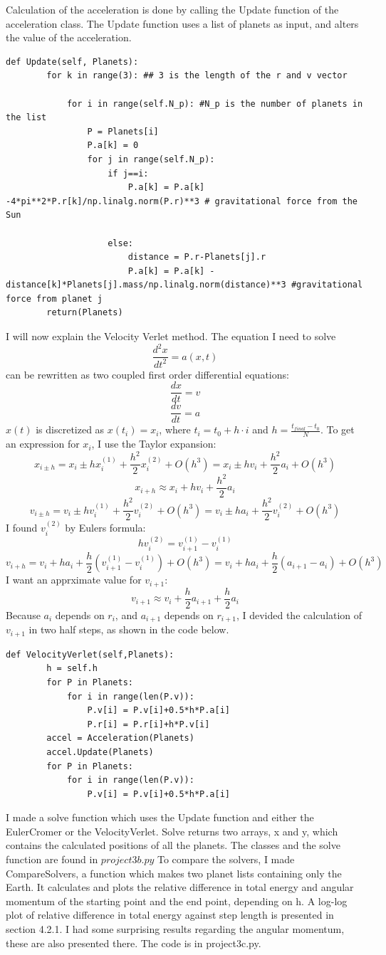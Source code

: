 \documentclass{article}
\begin{document}
Calculation of the acceleration is done by calling the Update function of the acceleration class. The Update function uses a list of planets as input, and alters the value of the acceleration. 
\begin{verbatim}
def Update(self, Planets):
		for k in range(3): ## 3 is the length of the r and v vector

			for i in range(self.N_p): #N_p is the number of planets in the list
				P = Planets[i]
				P.a[k] = 0
				for j in range(self.N_p):
					if j==i:
						P.a[k] = P.a[k] -4*pi**2*P.r[k]/np.linalg.norm(P.r)**3 # gravitational force from the Sun
						
					else: 
						distance = P.r-Planets[j].r
						P.a[k] = P.a[k] - distance[k]*Planets[j].mass/np.linalg.norm(distance)**3 #gravitational force from planet j
		return(Planets)

\end{verbatim}


I will now explain the Velocity Verlet method. 
The equation I need to solve $$\frac{d^2x}{dt^2}=a(x,t)$$ can be rewritten as two coupled first order differential equations:
$$\frac{dx}{dt} = v$$
$$\frac{dv}{dt} = a$$
$x(t)$ is discretized as $x(t_i)=x_i$, where $t_i =t_0 +h\cdot i$ and $h=\frac{t_{final}-t_0}{N}$. To get an expression for $x_i$, I use the Taylor expansion:
$$x_{i \pm h}  = x_i \pm hx_i^{(1)}+\frac{h^2}{2} x_i^{(2)}+O(h^3)=x_i \pm hv_i + \frac{h^2}{2}a_i +O(h^3)$$
$$x_{i + h}  \approx x_i + hv_i + \frac{h^2}{2}a_i$$
$$v_{i \pm h}  = v_i \pm hv_i^{(1)}+\frac{h^2}{2} v_i^{(2)}+O(h^3) = v_i \pm ha_i + \frac{h^2}{2} v_i^{(2)}+O(h^3)$$
I found $v_i^{(2)}$  by Eulers formula: 
$$hv_i^{(2)}=v_{i+1}^{(1)}-v_i^{(1)}$$
$$v_{i + h} = v_i + ha_i + \frac{h}{2} (v_{i+1}^{(1)}-v_i^{(1)})+O(h^3)= v_i + ha_i + \frac{h}{2}(a_{i+1}-a_{i})+O(h^3)$$
I want an apprximate value for $v_{i+1}$:
$$v_{i+1} \approx v_i + \frac{h}{2}a_{i+1}+\frac{h}{2} a_{i}$$
Because $a_i$ depends on $r_i$, and $a_{i+1}$ depends on $r_{i+1}$, I devided the calculation of $v_{i+1}$ in two half steps, as shown in the code below. 
\begin{verbatim}
def VelocityVerlet(self,Planets):
		h = self.h
		for P in Planets:
			for i in range(len(P.v)):
				P.v[i] = P.v[i]+0.5*h*P.a[i]
				P.r[i] = P.r[i]+h*P.v[i]
		accel = Acceleration(Planets)
		accel.Update(Planets)
		for P in Planets:
			for i in range(len(P.v)):
				P.v[i] = P.v[i]+0.5*h*P.a[i]
\end{verbatim}
I made a solve function which uses the Update function and either the EulerCromer or the VelocityVerlet. Solve returns two arrays, x and y, which contains the calculated positions of all the planets. The classes and the solve function are found in $project3b.py$  
To compare the solvers, I made CompareSolvers, a function which makes two planet lists containing only the Earth. It calculates and plots the relative difference in total energy and angular momentum of the starting point and the end point, depending on h. A log-log plot of relative difference in total energy against step length is presented in section 4.2.1. I had some surprising results regarding the angular momentum, these are also presented there. The code is in project3c.py. 
\end{document}
